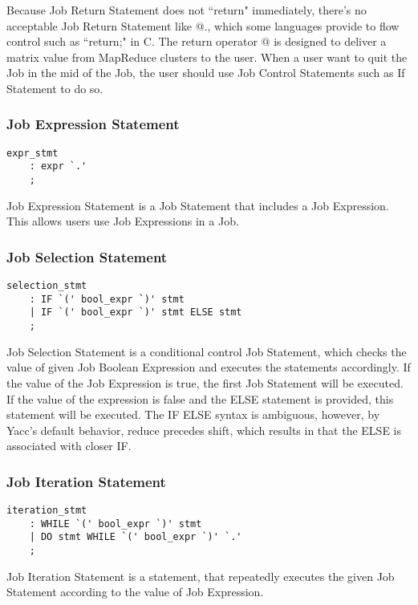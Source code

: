 \documentclass[prodmode,acmtecs]{acmsmall}
\begin{document}
Because Job Return Statement does not ``return" immediately,
there's no acceptable Job Return Statement like $@.$, which some
languages provide to flow control such as ``return;" in C.  The
return operator $@$ is designed to deliver a matrix value from
MapReduce clusters to the user.  When a user want to quit the Job
in the mid of the Job, the user should use Job Control Statements
such as If Statement to do so.
\medskip


\subsubsection{Job Expression Statement}

\begin{lstlisting}
expr_stmt
	: expr `.'
	;
\end{lstlisting}

Job Expression Statement is a Job Statement that includes a Job
Expression.  This allows users use Job Expressions in a Job.
\medskip

\subsubsection{Job Selection Statement}

\begin{lstlisting}
selection_stmt
	: IF `(' bool_expr `)' stmt
	| IF `(' bool_expr `)' stmt ELSE stmt
	;
\end{lstlisting}

Job Selection Statement is a conditional control Job Statement,
which checks the value of given Job Boolean Expression and executes
the statements accordingly.  If the value of the Job Expression is
true, the first Job Statement will be executed.  If the value of
the expression is false and the ELSE statement is provided, this
statement will be executed.  The IF ELSE syntax is ambiguous,
however, by Yacc's default behavior, reduce precedes shift, which
results in that the ELSE is associated with closer IF.
\medskip

\subsubsection{Job Iteration Statement}

\begin{lstlisting}
iteration_stmt
	: WHILE `(' bool_expr `)' stmt
	| DO stmt WHILE `(' bool_expr `)' `.'
	;
\end{lstlisting}

Job Iteration Statement is a statement, that repeatedly executes
the given Job Statement according to the value of Job Expression.
\end{document}
